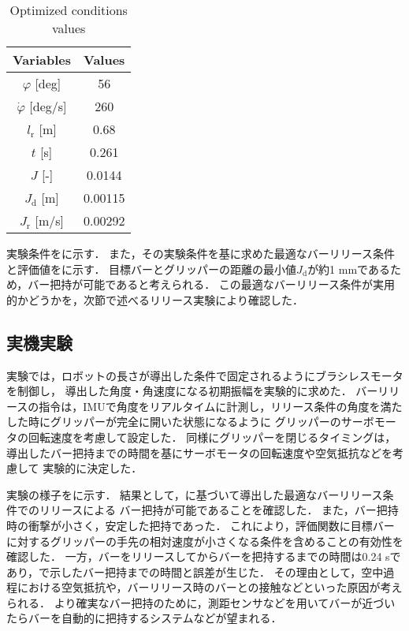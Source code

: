         \begin{table}[tb]
          
          \begin{center}
            \caption{Optimized conditions values}
            \vspace{2mm}
            \begin{tabular}{c|c}
              \hline
              Variables & Values \\
              \hline
              $\varphi$ [deg] & 56 \\
              $\dot{\varphi}$ [deg/s] & 260 \\
              $l_{\mathrm{r}}$ [m] & 0.68 \\
              $t$ [s] & 0.261 \\
              $J$ [-] & 0.0144 \\
              $J_{\mathrm{d}}$ [m] & 0.00115 \\
              $J_{\mathrm{r}}$ [m/s] & 0.00292 \\
              \hline
            \end{tabular}
          \end{center}
        \end{table}
        実験条件をに示す．
        また，その実験条件を基に求めた最適なバーリリース条件と評価値をに示す．
        目標バーとグリッパーの距離の最小値$J_{\mathrm{d}}$が約1 mmであるため，バー把持が可能であると考えられる．
        この最適なバーリリース条件が実用的かどうかを，次節で述べるリリース実験により確認した．
        
        \subsection{実機実験}
        実験では，ロボットの長さが導出した条件で固定されるようにブラシレスモータを制御し，
        導出した角度・角速度になる初期振幅を実験的に求めた．
        バーリリースの指令は，IMUで角度をリアルタイムに計測し，リリース条件の角度を満たした時にグリッパーが完全に開いた状態になるように
        グリッパーのサーボモータの回転速度を考慮して設定した．
        同様にグリッパーを閉じるタイミングは，導出したバー把持までの時間を基にサーボモータの回転速度や空気抵抗などを考慮して
        実験的に決定した．
        
        実験の様子をに示す．
        結果として，に基づいて導出した最適なバーリリース条件でのリリースによる
        バー把持が可能であることを確認した．
        また，バー把持時の衝撃が小さく，安定した把持であった．
        これにより，評価関数に目標バーに対するグリッパーの手先の相対速度が小さくなる条件を含めることの有効性を確認した．
        一方，バーをリリースしてからバーを把持するまでの時間は0.24 sであり，で示したバー把持までの時間と誤差が生じた．
        その理由として，空中過程における空気抵抗や，バーリリース時のバーとの接触などといった原因が考えられる．
        より確実なバー把持のために，測距センサなどを用いてバーが近づいたらバーを自動的に把持するシステムなどが望まれる．
        


